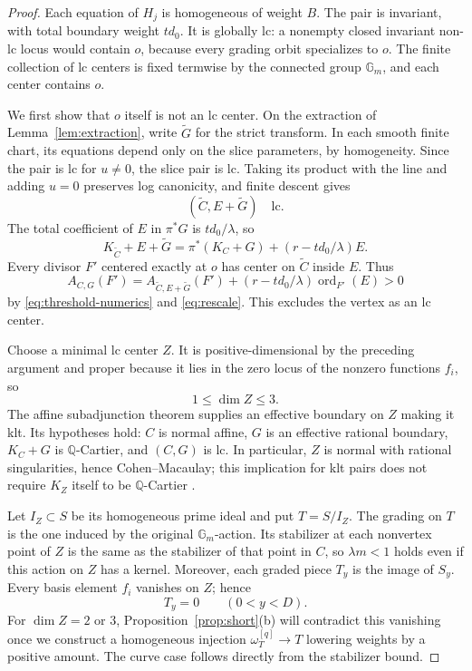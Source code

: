 \documentclass[11pt]{article}
\theoremstyle{definition}
\theoremstyle{remark}
\numberwithin{equation}{section}
\newcommand{\Q}{\mathbb Q}
\newcommand{\Gm}{\mathbb G_m}
\newcommand{\ord}{\operatorname{ord}}
\begin{document}
\begin{proof}
Each equation of \(H_j\) is homogeneous of weight \(B\). The pair is invariant, with total boundary weight \(td_0\). It is globally lc: a nonempty closed invariant non-lc locus would contain \(o\), because every grading orbit specializes to \(o\). The finite collection of lc centers is fixed termwise by the connected group \(\Gm\), and each center contains \(o\).

We first show that \(o\) itself is not an lc center. On the extraction of Lemma~\ref{lem:extraction}, write \(\widetilde G\) for the strict transform. In each smooth finite chart, its equations depend only on the slice parameters, by homogeneity. Since the pair is lc for \(u\ne0\), the slice pair is lc. Taking its product with the line and adding \(u=0\) preserves log canonicity, and finite descent gives
\[
(\widetilde C,E+\widetilde G)\quad\text{lc}.
\]
The total coefficient of \(E\) in \(\pi^*G\) is \(td_0/\lambda\), so
\[
K_{\widetilde C}+E+\widetilde G
=\pi^*(K_C+G)+(r-td_0/\lambda)E.
\]
Every divisor \(F'\) centered exactly at \(o\) has center on \(\widetilde C\) inside \(E\). Thus
\[
A_{C,G}(F')
=A_{\widetilde C,E+\widetilde G}(F')
+(r-td_0/\lambda)\ord_{F'}(E)>0
\]
by \eqref{eq:threshold-numerics} and \eqref{eq:rescale}. This excludes the vertex as an lc center.

Choose a minimal lc center \(Z\). It is positive-dimensional by the preceding argument and proper because it lies in the zero locus of the nonzero functions \(f_i\), so
\[
1\le\dim Z\le3.
\]
The affine subadjunction theorem \cite[Theorem~7.2]{FG} supplies an effective boundary on \(Z\) making it klt. Its hypotheses hold: \(C\) is normal affine, \(G\) is an effective rational boundary, \(K_C+G\) is \(\Q\)-Cartier, and \((C,G)\) is lc. In particular, \(Z\) is normal with rational singularities, hence Cohen--Macaulay; this implication for klt pairs does not require \(K_Z\) itself to be \(\Q\)-Cartier \cite[Theorem~120]{KollarRational}.

Let \(I_Z\subset S\) be its homogeneous prime ideal and put \(T=S/I_Z\). The grading on \(T\) is the one induced by the original \(\Gm\)-action. Its stabilizer at each nonvertex point of \(Z\) is the same as the stabilizer of that point in \(C\), so \(\lambda m<1\) holds even if this action on \(Z\) has a kernel. Moreover, each graded piece \(T_y\) is the image of \(S_y\). Every basis element \(f_i\) vanishes on \(Z\); hence
\[
T_y=0\qquad(0<y<D).
\]
For \(\dim Z=2\) or \(3\), Proposition~\ref{prop:short}(b) will contradict this vanishing once we construct a homogeneous injection \(\omega_T^{[q]}\to T\) lowering weights by a positive amount. The curve case follows directly from the stabilizer bound.


\end{proof}
\end{document}
